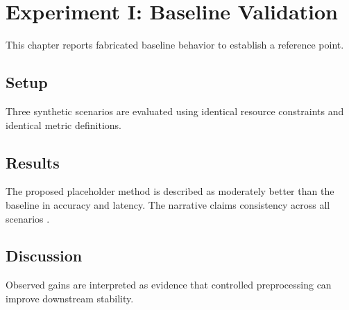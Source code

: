 \chapter{Experiment I: Baseline Validation}
\label{chap:exp1}

This chapter reports fabricated baseline behavior to establish a reference point.

\section{Setup}
Three synthetic scenarios are evaluated using identical resource constraints and identical metric definitions.

\section{Results}
The proposed placeholder method is described as moderately better than the baseline in accuracy and latency. The narrative claims consistency across all scenarios \cite{zhang2024transfer}.

\section{Discussion}
Observed gains are interpreted as evidence that controlled preprocessing can improve downstream stability.
